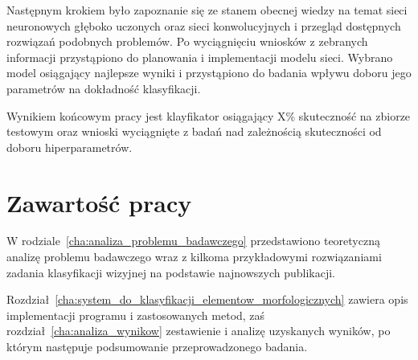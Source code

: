 Następnym krokiem było zapoznanie się ze stanem obecnej wiedzy na temat sieci neuronowych głęboko uczonych oraz sieci konwolucyjnych i przegląd dostępnych rozwiązań podobnych problemów. Po wyciągnięciu wniosków z zebranych informacji przystąpiono do planowania i implementacji modelu sieci. Wybrano model osiągający najlepsze wyniki i przystąpiono do badania wpływu doboru jego parametrów na dokładność klasyfikacji.

Wynikiem końcowym pracy jest klayfikator osiągający X\% skuteczność na zbiorze testowym oraz wnioski wyciągnięte z badań nad zależnością skuteczności od doboru hiperparametrów.

\section{Zawartość pracy}
\label{sec:zawartosc_pracy}

W rodziale~\ref{cha:analiza_problemu_badawczego} przedstawiono teoretyczną analizę problemu badawczego wraz z kilkoma przykładowymi rozwiązaniami zadania klasyfikacji wizyjnej na podstawie najnowszych publikacji. 

Rozdział~\ref{cha:system_do_klasyfikacji_elementow_morfologicznych} zawiera opis implementacji programu i zastosowanych metod, zaś rozdział~\ref{cha:analiza_wynikow} zestawienie i analizę uzyskanych wyników, po którym następuje podsumowanie przeprowadzonego badania.
